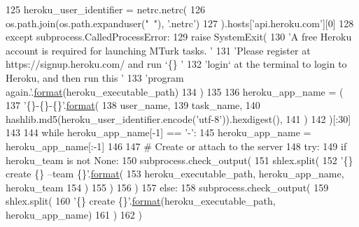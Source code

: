 \begin{DoxyCode}
125             heroku\_user\_identifier = netrc.netrc(
126                 os.path.join(os.path.expanduser(\textcolor{stringliteral}{"~"}), \textcolor{stringliteral}{'.netrc'})
127             ).hosts[\textcolor{stringliteral}{'api.heroku.com'}][0]
128         \textcolor{keywordflow}{except} subprocess.CalledProcessError:
129             \textcolor{keywordflow}{raise} SystemExit(
130                 \textcolor{stringliteral}{'A free Heroku account is required for launching MTurk tasks. '}
131                 \textcolor{stringliteral}{'Please register at https://signup.heroku.com/ and run `\{\} '}
132                 \textcolor{stringliteral}{'login` at the terminal to login to Heroku, and then run this '}
133                 \textcolor{stringliteral}{'program again.'}.\hyperlink{namespaceparlai_1_1chat__service_1_1services_1_1messenger_1_1shared__utils_a32e2e2022b824fbaf80c747160b52a76}{format}(heroku\_executable\_path)
134             )
135 
136     heroku\_app\_name = (
137         \textcolor{stringliteral}{'\{\}-\{\}-\{\}'}.\hyperlink{namespaceparlai_1_1chat__service_1_1services_1_1messenger_1_1shared__utils_a32e2e2022b824fbaf80c747160b52a76}{format}(
138             user\_name,
139             task\_name,
140             hashlib.md5(heroku\_user\_identifier.encode(\textcolor{stringliteral}{'utf-8'})).hexdigest(),
141         )
142     )[:30]
143 
144     \textcolor{keywordflow}{while} heroku\_app\_name[-1] == \textcolor{stringliteral}{'-'}:
145         heroku\_app\_name = heroku\_app\_name[:-1]
146 
147     \textcolor{comment}{# Create or attach to the server}
148     \textcolor{keywordflow}{try}:
149         \textcolor{keywordflow}{if} heroku\_team \textcolor{keywordflow}{is} \textcolor{keywordflow}{not} \textcolor{keywordtype}{None}:
150             subprocess.check\_output(
151                 shlex.split(
152                     \textcolor{stringliteral}{'\{\} create \{\} --team \{\}'}.\hyperlink{namespaceparlai_1_1chat__service_1_1services_1_1messenger_1_1shared__utils_a32e2e2022b824fbaf80c747160b52a76}{format}(
153                         heroku\_executable\_path, heroku\_app\_name, heroku\_team
154                     )
155                 )
156             )
157         \textcolor{keywordflow}{else}:
158             subprocess.check\_output(
159                 shlex.split(
160                     \textcolor{stringliteral}{'\{\} create \{\}'}.\hyperlink{namespaceparlai_1_1chat__service_1_1services_1_1messenger_1_1shared__utils_a32e2e2022b824fbaf80c747160b52a76}{format}(heroku\_executable\_path, heroku\_app\_name)
161                 )
162             )

\end{DoxyCode}
